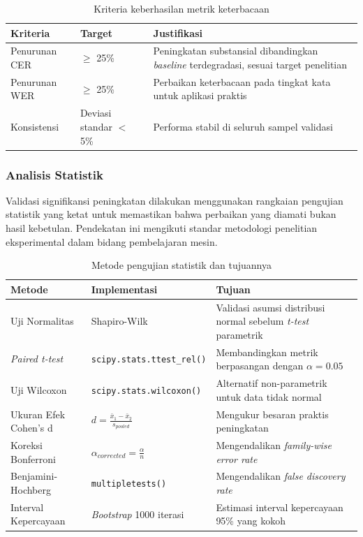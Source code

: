 \documentclass[12pt,a4paper]{article}
\begin{document}
\begin{table}[H]
\centering
\caption{Kriteria keberhasilan metrik keterbacaan}
\label{tab:readability-criteria}
\small
\begin{tabular}{|l|l|p{7cm}|}
\hline
\textbf{Kriteria} & \textbf{Target} & \textbf{Justifikasi} \\ \hline
Penurunan CER & $\geq$ 25\% & Peningkatan substansial dibandingkan \textit{baseline} terdegradasi, sesuai target penelitian \\ \hline
Penurunan WER & $\geq$ 25\% & Perbaikan keterbacaan pada tingkat kata untuk aplikasi praktis \\ \hline
Konsistensi & Deviasi standar $<$ 5\% & Performa stabil di seluruh sampel validasi \\ \hline
\end{tabular}
\end{table}

\subsubsection{Analisis Statistik}
Validasi signifikansi peningkatan dilakukan menggunakan rangkaian pengujian statistik yang ketat untuk memastikan bahwa perbaikan yang diamati bukan hasil kebetulan. Pendekatan ini mengikuti standar metodologi penelitian eksperimental dalam bidang pembelajaran mesin.

\begin{table}[H]
\centering
\caption{Metode pengujian statistik dan tujuannya}
\label{tab:statistical-tests}
\small
\begin{tabular}{|l|l|p{6.5cm}|}
\hline
\textbf{Metode} & \textbf{Implementasi} & \textbf{Tujuan} \\ \hline
Uji Normalitas & Shapiro-Wilk & Validasi asumsi distribusi normal sebelum \textit{t-test} parametrik \\ \hline
\textit{Paired t-test} & \texttt{scipy.stats.ttest\_rel()} & Membandingkan metrik berpasangan dengan $\alpha = 0.05$ \\ \hline
Uji Wilcoxon & \texttt{scipy.stats.wilcoxon()} & Alternatif non-parametrik untuk data tidak normal \\ \hline
Ukuran Efek Cohen's d & $d = \frac{\bar{x}_1 - \bar{x}_2}{s_{pooled}}$ & Mengukur besaran praktis peningkatan \\ \hline
Koreksi Bonferroni & $\alpha_{corrected} = \frac{\alpha}{n}$ & Mengendalikan \textit{family-wise error rate} \\ \hline
Benjamini-Hochberg & \texttt{multipletests()} & Mengendalikan \textit{false discovery rate} \\ \hline
Interval Kepercayaan & \textit{Bootstrap} 1000 iterasi & Estimasi interval kepercayaan 95\% yang kokoh \\ \hline
\end{tabular}
\end{table}
\end{document}
